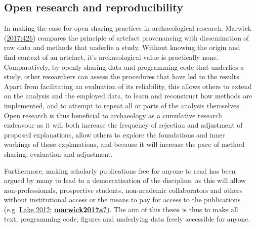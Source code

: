 \documentclass[
  a4paper,
  oneside]{uiophdthesis}
\begin{document}
\hypertarget{open-research-and-reproducibility}{%
\subsection{Open research and reproducibility}\label{open-research-and-reproducibility}}

In making the case for open sharing practices in archaeological research, Marwick (\protect\hyperlink{ref-marwick2017}{2017:426}) compares the principle of artefact provenancing with dissemination of raw data and methods that underlie a study. Without knowing the origin and find-context of an artefact, it's archaeological value is practically none. Comparatively, by openly sharing data and programming code that underlies a study, other researchers can assess the procedures that have led to the results. Apart from facilitating an evaluation of its reliability, this allows others to extend on the analysis and the employed data, to learn and reconstruct how methods are implemented, and to attempt to repeat all or parts of the analysis themselves. Open research is thus beneficial to archaeology as a cumulative research endeavour as it will both increase the frequency of rejection and adjustment of proposed explanations, allow others to explore the foundations and inner workings of these explanations, and because it will increase the pace of method sharing, evaluation and adjustment.

Furthermore, making scholarly publications free for anyone to read has been argued by many to lead to a democratisation of the discipline, as this will allow non-professionals, prospective students, non-academic collaborators and others without institutional access or the means to pay for access to the publications (e.g. \protect\hyperlink{ref-lake2012}{Lake 2012}; \protect\hyperlink{ref-marwick2017a}{\textbf{marwick2017a?}}). The aim of this thesis is thus to make all text, programming code, figures and underlying data freely accessible for anyone.
\end{document}

